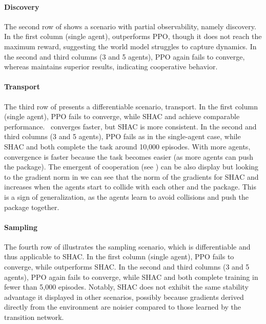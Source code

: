 \paragraph{Discovery} 
The second row of  shows a scenario with partial observability, namely discovery. In the first column (single agent), \fname{} outperforms PPO, though it does not reach the maximum reward, suggesting the world model struggles to capture dynamics. In the second and third columns (3 and 5 agents), PPO again fails to converge, whereas \fname{} maintains superior results, indicating cooperative behavior.

\paragraph{Transport}
The third row of  presents a differentiable scenario, transport. In the first column (single agent), PPO fails to converge, while SHAC and \fname{} achieve comparable performance.\ \fname{} converges faster, but SHAC is more consistent. In the second and third columns (3 and 5 agents), PPO fails as in the single-agent case, while SHAC and \fname{} both complete the task around 10,000 episodes. With more agents, convergence is faster because the task becomes easier (as more agents can push the package). The emergent of cooperation (see ) can be also display but looking to the gradient norm in  we can see that the norm of the gradients for SHAC and \fname{} increases when the agents start to collide with each other and the package. This is a sign of generalization, as the agents learn to avoid collisions and push the package together.

\paragraph{Sampling}
The fourth row of  illustrates the sampling scenario, which is differentiable and thus applicable to SHAC\@. In the first column (single agent), PPO fails to converge, while \fname{} outperforms SHAC\@. In the second and third columns (3 and 5 agents), PPO again fails to converge, while SHAC and \fname{} both complete training in fewer than 5,000 episodes. Notably, SHAC does not exhibit the same stability advantage it displayed in other scenarios, possibly because gradients derived directly from the environment are noisier compared to those learned by the transition network.

